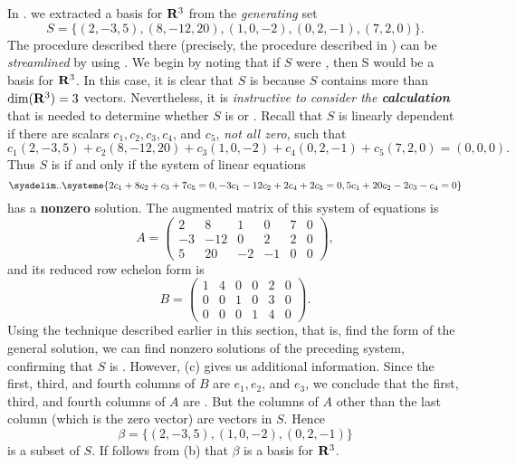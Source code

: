 In . we extracted a basis for \(\mathbf{R}^3\) from the \emph{generating} set
\[
    S = \{ (2, -3, 5), (8, -12, 20), (1, 0, -2), (0, 2, -1), (7, 2, 0) \}.
\]
The procedure described there (precisely, the procedure described in ) can be \emph{streamlined} by using .
We begin by noting that if \(S\) were \LID{}, then S would be a basis for \(\mathbf{R}^3\).
In this case, it is clear that \(S\) is \LDP{} because
\(S\) contains more than \(\dim(\mathbf{R}^3) = 3\) vectors.
Nevertheless, it is \emph{instructive to consider the \textbf{calculation}} that is needed to determine whether \(S\) is \LDP{} or \LID{}.
Recall that \(S\) is linearly dependent if there are scalars \(c_1, c_2, c_3, c_4\), and \(c_5\), \emph{not all zero}, such that
\[
    c_1(2, -3, 5) + c_2(8, -12, 20) + c_3(1, 0, -2) + c_4(0, 2, -1) + c_5(7, 2, 0) = (0, 0, 0).
\]
Thus \(S\) is \LDP{} if and only if the system of linear equations
\[
    \sysdelim..\systeme{
         2 c_1 +  8 c_2 +   c_3         + 7 c_5 = 0,
        -3 c_1 - 12 c_2         + 2 c_4 + 2 c_5 = 0,
         5 c_1 + 20 c_2 - 2 c_3 -   c_4         = 0
    }
\]
has a \textbf{nonzero} solution.
The augmented matrix of this system of equations is
\[
    A=\left(\begin{array}{rrrrrr}
        2 & 8 & 1 & 0 & 7 & 0 \\
        -3 & -12 & 0 & 2 & 2 & 0 \\
        5 & 20 & -2 & -1 & 0 & 0
    \end{array}\right),
\]
and its reduced row echelon form is
\[
    B=\left(\begin{array}{llllll}
        1 & 4 & 0 & 0 & 2 & 0 \\
        0 & 0 & 1 & 0 & 3 & 0 \\
        0 & 0 & 0 & 1 & 4 & 0
    \end{array}\right).
\]
Using the technique described earlier in this section, that is, find the form of the general solution, we can find nonzero solutions of the preceding system, confirming that \(S\) is \LDP{}.
However, (c) gives us additional information.
Since the first, third, and fourth columns of \(B\) are \(e_1, e_2\), and \(e_3\), we conclude that the first, third, and fourth columns of \(A\) are \LID{}.
But the columns of \(A\) other than the last column (which is the zero vector) are vectors in \(S\).
Hence
\[
    \beta = \{ (2, -3, 5), (1, 0, -2), (0, 2, -1) \}
\]
is a \LID{} subset of \(S\).
If follows from (b) that \(\beta\) is a basis for \(\mathbf{R}^3\).

